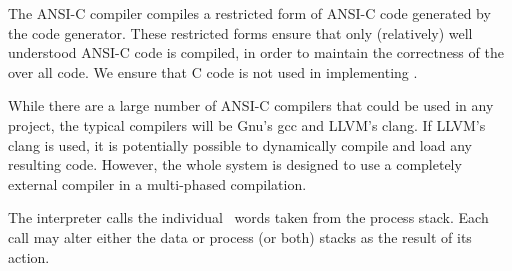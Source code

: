 \item {}

The ANSI-C compiler compiles a restricted form of ANSI-C code generated by 
the code generator. These restricted forms ensure that only (relatively) 
well understood ANSI-C code is compiled, in order to maintain the 
correctness of the over all code. We ensure that  C code is 
not used in implementing \joylol. 

While there are a large number of ANSI-C compilers that could be used in 
any project, the typical compilers will be Gnu's gcc and LLVM's clang. If 
LLVM's clang is used, it is potentially possible to dynamically compile 
and load any resulting code. However, the whole system is designed to use 
a completely external compiler in a multi-phased compilation. 

\item{}

The interpreter calls the individual \joylol\ words taken from the process 
stack. Each call may alter either the data or process (or both) stacks as 
the result of its action. 

\stopitemize

\stopitemize


